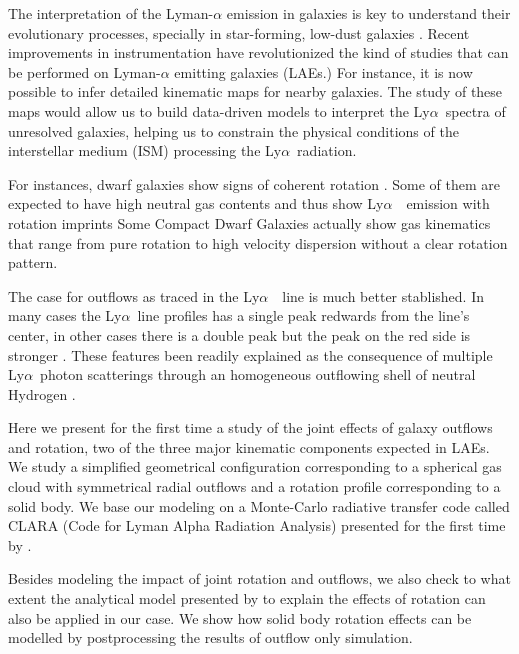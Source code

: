\documentclass[a4paper,fleqn,usenatbib]{mnras}
\newcommand{\lya}{\ifmmode{{\rm Ly}\alpha}\else Ly$\alpha$\ \fi}
\begin{document}
The interpretation of the Lyman-$\alpha$ emission in galaxies is
key to understand their evolutionary processes, specially in
star-forming, low-dust galaxies \citep{PartridgePeebles}.
Recent improvements in instrumentation have revolutionized the kind of
studies that can be performed on Lyman-$\alpha$ emitting galaxies
(LAEs.)
For instance, it is now possible to infer detailed kinematic maps for
nearby galaxies.
The study of these maps would allow us to build data-driven models to
interpret the \lya spectra of unresolved galaxies, helping us to
constrain the physical conditions of the interstellar medium (ISM)
processing the \lya radiation.


For instances, dwarf galaxies show signs of coherent rotation
\citep{2009A&A...493..871S}.
Some of them are expected to have high neutral gas contents and thus
show \lya\ emission with rotation imprints
\citep{2005A&A...433L...1B,2008ApJ...672..888T,2013MNRAS.434.2491G}
Some Compact Dwarf Galaxies actually show gas kinematics that range
from pure rotation to high velocity dispersion without a clear
rotation pattern.
\citep{2015A&A...577A..21C,2017A&A...600A.125C}

The case for outflows as traced in the \lya\ line is much better
stablished.
In many cases the \lya line profiles has a single peak
redwards from the line's center, in other cases there is a double peak
but the peak on the red side is stronger
\citep[e.g.][]{2010ApJ...717..289S,Erb14,Trainor16}.   
These features been readily explained as the consequence of multiple
\lya photon scatterings through an homogeneous outflowing shell of
neutral Hydrogen
\citep{2006A&A...460..397V,Orsi12,2012ApJ...751...29Y,2015ApJ...812..123G}.  


Here we present for the first time a study of the joint effects of
galaxy outflows and rotation, two of the three major kinematic
components expected in LAEs.
We study a simplified geometrical configuration corresponding to a
spherical gas cloud with symmetrical radial outflows and a rotation
profile corresponding to a solid body.
We base our modeling on a Monte-Carlo radiative transfer code called
CLARA (Code for Lyman Alpha Radiation Analysis) presented for the
first time by \cite{CLARA}.

Besides modeling the impact of joint rotation and outflows, we also
check to what extent the analytical model presented by
\cite{Garavito14} to explain the effects of rotation can also be
applied in our case.
We show how solid body rotation effects can be modelled by
postprocessing the results of outflow only simulation.
\end{document}
